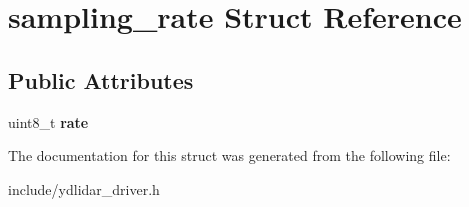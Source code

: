 \hypertarget{structsampling__rate}{}\section{sampling\+\_\+rate Struct Reference}
\label{structsampling__rate}
\subsection*{Public Attributes}
\begin{DoxyCompactItemize}
\item 
uint8\+\_\+t {\bfseries rate}\hypertarget{structsampling__rate_a8d860fbedd930d2022fe7bb6cf1f78b6}{}\label{structsampling__rate_a8d860fbedd930d2022fe7bb6cf1f78b6}

\end{DoxyCompactItemize}


The documentation for this struct was generated from the following file\+:\begin{DoxyCompactItemize}
\item 
include/ydlidar\+\_\+driver.\+h\end{DoxyCompactItemize}
